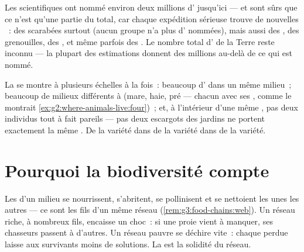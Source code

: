 \begin{example}\label{ex:g5:biodiversity:planet}
Les scientifiques ont nommé environ deux millions d' jusqu'ici
--- et sont sûrs que ce n'est qu'une partie du total, car chaque
expédition sérieuse trouve de nouvelles ~: des scarabées
surtout (aucun groupe n'a plus d' nommées), mais aussi des
, des grenouilles, des , et même parfois des
. Le nombre total d' de la Terre reste inconnu ---
la plupart des estimations donnent des millions au-delà de ce qui
est nommé.
\end{example}

\begin{remark}\label{rem:g5:biodiversity:scales}
La  se montre à plusieurs échelles à la fois~: beaucoup
d' dans un même milieu~; beaucoup de milieux différents  à
 (mare, haie, pré --- chacun avec ses , comme le montrait
\cref{ex:g2:where-animals-live:four})~; et, à l'intérieur d'une même
, pas deux individus tout à fait pareils --- pas deux escargots
des jardins ne portent exactement la même . De la variété
dans de la variété dans de la variété.
\end{remark}

\section{Pourquoi la biodiversité compte}

\begin{proposition}\label{prop:g5:biodiversity:web}
Les  d'un milieu se nourrissent, s'abritent, se pollinisent et
se nettoient les unes les autres --- ce sont les fils d'un même
réseau (\cref{rem:g3:food-chains:web}). Un réseau riche, à
nombreux fils, encaisse un choc~: si une  proie vient à
manquer, ses chasseurs passent à d'autres. Un réseau pauvre se
déchire vite~: chaque  perdue laisse aux survivants moins de
solutions. La  est la solidité du réseau.
\end{proposition}
\admitted

